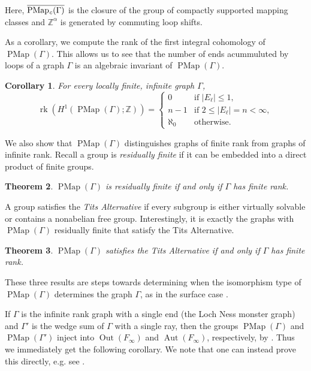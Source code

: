 \documentclass[11pt]{amsart}
\theoremstyle{plain}
\newtheorem{MAINTHM}{Theorem}
\newtheorem{MAINCOR}[MAINTHM]{Corollary}
\theoremstyle{definition}
\DeclareMathOperator{\Aut}{Aut}
\DeclareMathOperator{\Out}{Out}
\DeclareMathOperator{\PMap}{PMap}
\DeclareMathOperator{\PMapc}{PMap_{\it c}}
\DeclareMathOperator{\rk}{rk}
\newcommand{\Z}{\mathbb{Z}}
\def\G{{\Gamma}}
\newcommand{\<}{\langle}
\renewcommand{\>}{\rangle}
\begin{document}
Here, $\overline{\PMapc(\G)}$ is the closure of the group of compactly supported mapping classes and $\Z^{\alpha}$ is generated by commuting loop shifts. 

As a corollary, we compute the rank of the first integral cohomology of $\PMap(\G)$. This allows us to see that the number of ends acummuluted by loops of a graph $\G$ is an algebraic invariant of $\PMap(\G)$.
\begin{MAINCOR}\label{cor:rankoffirstcohomology}
For every locally finite, infinite graph $\G$,
    \[
    \rk \left(H^1(\PMap(\G);\Z)\right) =
        \begin{cases}
            0 & \text{if $|E_\ell| \le 1$}, \\
            n-1 & \text{if $2 \le |E_\ell|=n< \infty$}, \\
            \aleph_0 & \text{otherwise}.
        \end{cases}
    \]
\end{MAINCOR}

We also show that $\PMap(\G)$ distinguishes graphs of finite rank from graphs of infinite rank. Recall a group is \emph{residually finite} if it can be embedded into a direct product of finite groups.
\begin{MAINTHM}\label{thm:PMapRF}
   $\PMap(\G)$ is residually finite if and only if $\G$ has finite rank.
 \end{MAINTHM}

A group satisfies the \textit{Tits Alternative} if every subgroup is either virtually solvable or contains a nonabelian free group.
Interestingly, it is exactly the graphs with $\PMap(\G)$ residually finite that satisfy the Tits Alternative.
 \begin{MAINTHM}\label{thm:TA}
    $\PMap(\G)$ satisfies the Tits Alternative if and only if $\G$ has finite rank.
 \end{MAINTHM}
These three results are steps towards determining when the isomorphism type of $\PMap(\G)$ determines the graph $\G$, as in the surface case \cite{BDR2020}. 
 
If $\G$ is the infinite rank graph with a single end (the Loch Ness monster graph) and $\G'$ is the wedge sum of $\G$ with a single ray, then the groups $\PMap(\G)$ and $\PMap(\G')$ inject into $\Out(F_{\infty})$ and $\Aut(F_{\infty})$, respectively, by \cite[Theorem 3.1 and Lemma 3.2]{AB2021}. Thus we immediately get the following corollary. We note that one can instead prove this directly, e.g. see \cite{OutFinfinity2011}.
\end{document}

